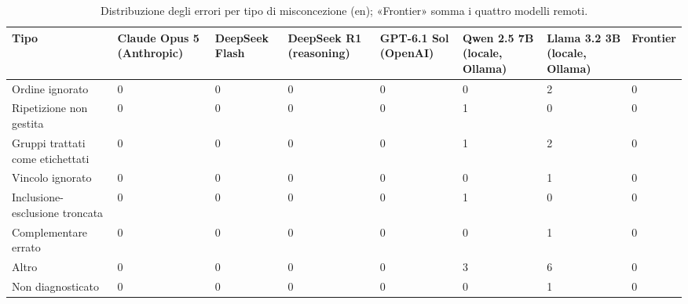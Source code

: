\begin{table}[htbp]
\centering\small
\begin{tabularx}{\textwidth}{lXXXXXXX}
\toprule
Tipo & Claude Opus 5 (Anthropic) & DeepSeek Flash & DeepSeek R1 (reasoning) & GPT-6.1 Sol (OpenAI) & Qwen 2.5 7B (locale, Ollama) & Llama 3.2 3B (locale, Ollama) & Frontier \\
\midrule
Ordine ignorato & 0 & 0 & 0 & 0 & 0 & 2 & 0 \\
Ripetizione non gestita & 0 & 0 & 0 & 0 & 1 & 0 & 0 \\
Gruppi trattati come etichettati & 0 & 0 & 0 & 0 & 1 & 2 & 0 \\
Vincolo ignorato & 0 & 0 & 0 & 0 & 0 & 1 & 0 \\
Inclusione-esclusione troncata & 0 & 0 & 0 & 0 & 1 & 0 & 0 \\
Complementare errato & 0 & 0 & 0 & 0 & 0 & 1 & 0 \\
Altro & 0 & 0 & 0 & 0 & 3 & 6 & 0 \\
Non diagnosticato & 0 & 0 & 0 & 0 & 0 & 1 & 0 \\
\bottomrule
\end{tabularx}
\caption{Distribuzione degli errori per tipo di misconcezione (en); «Frontier» somma i quattro modelli remoti.}
\label{tab:misconcezioni-en}
\end{table}
